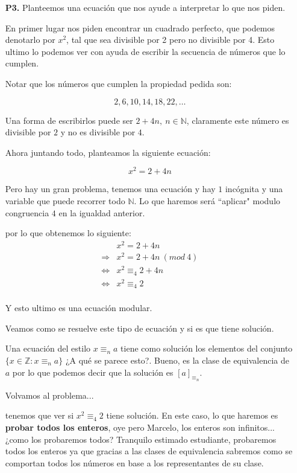 \documentclass[letterpaper,11pt]{article}
\newcommand{\N}{\mathbb N}
\newcommand{\Z}{\mathbb Z}
\theoremstyle{plain}
\begin{document}
\begin{enumerate}
\item[\bf P3.] Planteemos una ecuación que nos ayude a interpretar lo que nos piden.

En primer lugar nos piden encontrar un cuadrado perfecto, que podemos denotarlo por $x^2$, tal que sea divisible por 2 pero no divisible por 4. Esto ultimo lo podemos ver con ayuda de escribir la secuencia de números que lo cumplen. 

Notar que los números que cumplen la propiedad pedida son:

$$2,6,10,14,18,22,\dots$$

Una forma de escribirlos puede ser $2+4n, ~ n\in \N$, claramente este número es divisible por $2$ y no es divisible por $4$.

Ahora juntando todo, planteamos la siguiente ecuación:

$$ x^2=2+4n $$

Pero hay un gran problema, tenemos una ecuación y hay $1$ incógnita y una variable que puede recorrer todo $\N$. Lo que haremos será ``aplicar" modulo congruencia $4$ en la igualdad anterior.

por lo que obtenemos lo siguiente:
\begin{align*} 
 & x^2=2+4n  \\ 
\Longrightarrow  & x^2= 2+4n \ (mod ~ 4)\\
\Longleftrightarrow  & x^2\equiv_{4} 2+4n \\
\Longleftrightarrow  & x^2\equiv_{4} 2 \\
\end{align*}

Y esto ultimo es una ecuación modular.

Veamos como se resuelve este tipo de ecuación y si es que tiene solución.

Una ecuación del estilo $x\equiv_n a$ tiene como solución los elementos del conjunto $\{x\in \Z : x \equiv_n a\}$ ¿A qué se parece esto?. Bueno, es la clase de equivalencia de $a$ por lo que podemos decir que la solución es $[a]_{\equiv_n}$.

Volvamos al problema...

tenemos que ver si $x^2\equiv_{4} 2 $ tiene solución. En este caso, lo que haremos es \textbf{probar todos los enteros}, oye pero Marcelo, los enteros son infinitos... ¿como los probaremos todos? Tranquilo estimado estudiante, probaremos todos los enteros ya que gracias a las clases de equivalencia sabremos como se comportan todos los números en base a los representantes de su clase.


\end{enumerate}
\end{document}
